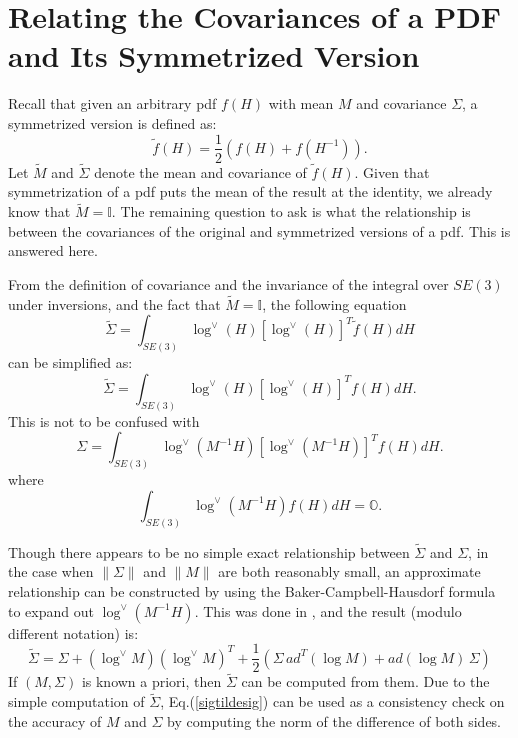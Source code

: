 \documentclass[twocolumn,10pt]{asme2ej}
\newcommand{\half}{\frac{1}{2}}
\begin{document}
\section{Relating the Covariances of a PDF and Its Symmetrized Version}

Recall that given an arbitrary pdf $f(H)$ with mean $M$ and covariance $\Sigma$, a symmetrized version is defined as:
$$ \tilde{f}(H) = \half ({f}(H) + {f}(H^{-1}) ). $$
Let $\tilde{M}$ and $\tilde{\Sigma}$ denote the mean and covariance of $\tilde{f}(H)$. 
Given that symmetrization of a pdf puts the mean of the result at the identity, we already know that $\tilde{M} = \mathbb{I}$.
The remaining question to ask is what the relationship is between the covariances of the original and symmetrized versions of a pdf.
This is answered here.

From the definition of covariance and the invariance of the integral over $SE(3)$ under inversions, and the fact that $\tilde{M} = \mathbb{I}$, the following equation
$$ \tilde{\Sigma} = \int_{SE(3)} \log^{\vee}(H)  [\log^{\vee}(H)]^T \tilde{f}(H) dH $$
can be simplified as:
$$ \tilde{\Sigma} = \int_{SE(3)} \log^{\vee}(H)  [\log^{\vee}(H)]^T {f}(H) dH. $$
This is not to be confused with
$$ {\Sigma} = \int_{SE(3)} \log^{\vee}(M^{-1} H)  [\log^{\vee}(M^{-1} H)]^T {f}(H) dH. $$
where
$$ \int_{SE(3)} \log^{\vee}(M^{-1} H)  {f}(H) dH = \mathbb{O}. $$

Though there appears to be no simple exact relationship between $\tilde{\Sigma}$ and ${\Sigma}$, in the case when $\|\Sigma\|$ and $\|M\|$ are both reasonably
small, an approximate relationship can be constructed by using the Baker-Campbell-Hausdorf formula to expand out $\log^{\vee}(M^{-1} H)$. 
This was done in \cite{wang06}, and the result (modulo different notation) is:
\begin{equation}
\tilde{\Sigma} = \Sigma + (\log^{\vee} M)(\log^{\vee} M)^T + \half \left(\Sigma \, ad^T(\log M) + ad(\log M) \, \Sigma\right)
\label{sigtildesig}
\end{equation}
If $(M,{\Sigma})$ is known a priori, then $\tilde{\Sigma}$ can be computed from them. Due to the simple computation of $\tilde{\Sigma}$, Eq.(\ref{sigtildesig}) can be used as a consistency
check on the accuracy of $M$ and $\Sigma$ by computing the norm of the difference of both sides.
\end{document}
